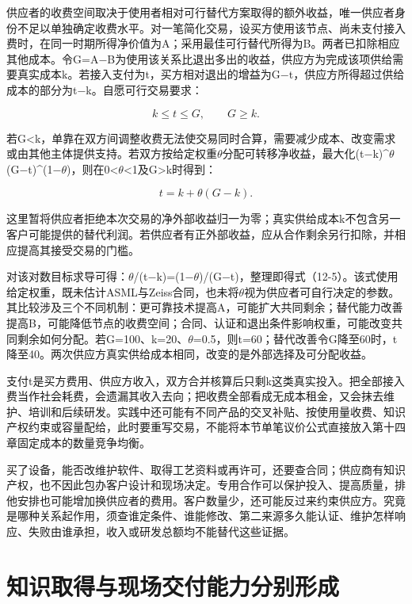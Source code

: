 \documentclass[UTF8,fontset=windows,12pt,a4paper,oneside,openany]{ctexbook}
\begin{document}
供应者的收费空间取决于使用者相对可行替代方案取得的额外收益，唯一供应者身份不足以单独确定收费水平。对一笔简化交易，设买方使用该节点、尚未支付接入费时，在同一时期所得净价值为A；采用最佳可行替代所得为B。两者已扣除相应其他成本。令G=A\ensuremath{-}B为使用该关系比退出多出的收益，供应方为完成该项供给需要真实成本k。若接入支付为t，买方相对退出的增益为G\ensuremath{-}t，供应方所得超过供给成本的部分为t\ensuremath{-}k。自愿可行交易要求：

\[
k\leq t\leq G,\qquad G\geq k.\tag{12-4}
\]

若G<k，单靠在双方间调整收费无法使交易同时合算，需要减少成本、改变需求或由其他主体提供支持。若双方按给定权重\ensuremath{\theta}分配可转移净收益，最大化(t\ensuremath{-}k)\textasciicircum{}\ensuremath{\theta}(G\ensuremath{-}t)\textasciicircum{}(1\ensuremath{-}\ensuremath{\theta})，则在0<\ensuremath{\theta}<1及G>k时得到：

\[
t=k+\theta(G-k).\tag{12-5}
\]

这里暂将供应者拒绝本次交易的净外部收益归一为零；真实供给成本k不包含另一客户可能提供的替代利润。若供应者有正外部收益，应从合作剩余另行扣除，并相应提高其接受交易的门槛。

对该对数目标求导可得：\ensuremath{\theta}/(t\ensuremath{-}k)=(1\ensuremath{-}\ensuremath{\theta})/(G\ensuremath{-}t)，整理即得式（12-5）。该式使用给定权重，既未估计ASML与Zeiss合同，也未将\ensuremath{\theta}视为供应者可自行决定的参数。其比较涉及三个不同机制：更可靠技术提高A，可能扩大共同剩余；替代能力改善提高B，可能降低节点的收费空间；合同、认证和退出条件影响权重，可能改变共同剩余如何分配。若G=100、k=20、\ensuremath{\theta}=0.5，则t=60；替代改善令G降至60时，t降至40。两次供应方真实供给成本相同，改变的是外部选择及可分配收益。

支付t是买方费用、供应方收入，双方合并核算后只剩k这类真实投入。把全部接入费当作社会耗费，会遗漏其收入去向；把收费全部看成无成本租金，又会抹去维护、培训和后续研发。实践中还可能有不同产品的交叉补贴、按使用量收费、知识产权约束或容量配给，此时要重写交易，不能将本节单笔议价公式直接放入第十四章固定成本的数量竞争均衡。

买了设备，能否改维护软件、取得工艺资料或再许可，还要查合同；供应商有知识产权，也不因此包办客户设计和现场决定。专用合作可以保护投入、提高质量，排他安排也可能增加换供应者的费用。客户数量少，还可能反过来约束供应方。究竟是哪种关系起作用，须查谁定条件、谁能修改、第二来源多久能认证、维护怎样响应、失败由谁承担，收入或研发总额均不能替代这些证据。

\section{知识取得与现场交付能力分别形成}
\end{document}
